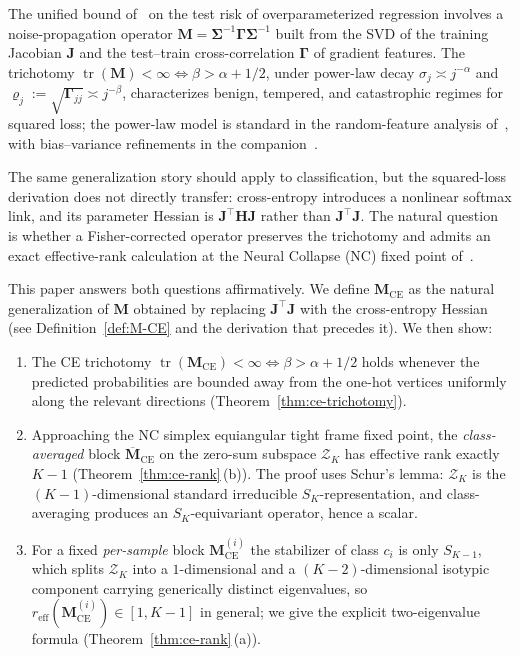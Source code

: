 \documentclass[12pt]{amsart}
\theoremstyle{definition}
\theoremstyle{remark}
\DeclareMathOperator{\tr}{tr}
\newcommand{\bJ}{\mathbf{J}}
\newcommand{\bM}{\mathbf{M}}
\newcommand{\bH}{\mathbf{H}}
\newcommand{\bSigma}{\boldsymbol{\Sigma}}
\newcommand{\bGamma}{\boldsymbol{\Gamma}}
\begin{document}
The unified bound of~\cite{paperA} on the test risk of
overparameterized regression involves a noise-propagation operator
$\bM = \bSigma^{-1}\bGamma\bSigma^{-1}$ built from the SVD of the
training Jacobian $\bJ$ and the test--train cross-correlation
$\bGamma$ of gradient features. The trichotomy
$\tr(\bM) < \infty \iff \beta > \alpha + 1/2$, under power-law
decay $\sigma_{j} \asymp j^{-\alpha}$ and
$\varrho_{j} := \sqrt{\bGamma_{jj}} \asymp j^{-\beta}$, characterizes
benign, tempered, and catastrophic regimes for squared loss; the
power-law model is standard in the random-feature analysis
of~\cite{mei2022}, with bias--variance refinements
in the companion~\cite{paperB}.

The same generalization story should apply to classification, but
the squared-loss derivation does not directly transfer: cross-entropy
introduces a nonlinear softmax link, and its parameter Hessian is
$\bJ^{\top}\bH\bJ$ rather than $\bJ^{\top}\bJ$. The natural question
is whether a Fisher-corrected operator preserves the trichotomy and
admits an exact effective-rank calculation at the Neural Collapse
(NC) fixed point of~\cite{papyan2020}.

This paper answers both questions affirmatively. We define
$\bM_{\mathrm{CE}}$ as the natural generalization of $\bM$ obtained
by replacing $\bJ^{\top}\bJ$ with the cross-entropy Hessian (see
Definition~\ref{def:M-CE} and the derivation that precedes it).
We then show:

\begin{enumerate}[label=(\roman*)]
\item The CE trichotomy
$\tr(\bM_{\mathrm{CE}}) < \infty \iff \beta > \alpha + 1/2$
holds whenever the predicted probabilities are bounded away from the
one-hot vertices uniformly along the relevant directions
(Theorem~\ref{thm:ce-trichotomy}).

\item Approaching the NC simplex equiangular tight frame fixed
point, the \emph{class-averaged} block
$\overline{\bM}_{\mathrm{CE}}$ on the zero-sum subspace
$\mathcal{Z}_{K}$ has effective rank exactly $K-1$
(Theorem~\ref{thm:ce-rank}\,(b)). The proof uses Schur's lemma:
$\mathcal{Z}_{K}$ is the $(K-1)$-dimensional standard irreducible
$S_{K}$-representation, and class-averaging produces an
$S_{K}$-equivariant operator, hence a scalar.
\item For a fixed \emph{per-sample} block $\bM_{\mathrm{CE}}^{(i)}$
the stabilizer of class $c_{i}$ is only $S_{K-1}$, which splits
$\mathcal{Z}_{K}$ into a $1$-dimensional and a $(K-2)$-dimensional
isotypic component carrying generically distinct eigenvalues, so
$r_{\mathrm{eff}}(\bM_{\mathrm{CE}}^{(i)}) \in [1, K-1]$ in
general; we give the explicit two-eigenvalue formula
(Theorem~\ref{thm:ce-rank}\,(a)).
\end{enumerate}
\end{document}
